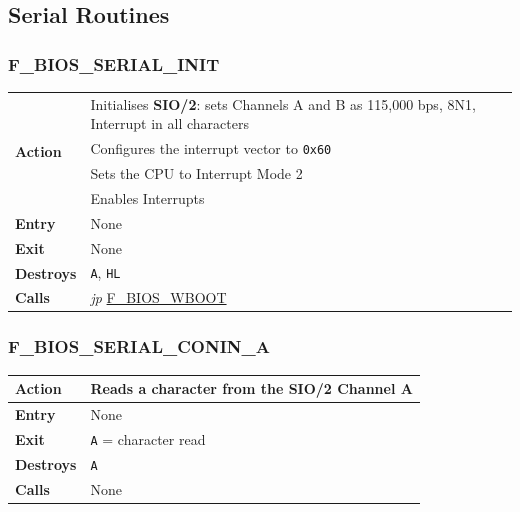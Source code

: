 \documentclass[a4paper,11pt]{article}
\begin{document}
    \subsection{Serial Routines}

        \subsubsection{F\_BIOS\_SERIAL\_INIT}
        \label{func:fbiosserialinit}
        \begin{tabular}{l p{9cm}}
            \hline\multirow[t]{4}{4em}{\textbf{Action}}
            & Initialises \textbf{SIO/2}: sets Channels A and B as 115,000 bps, 
            8N1, Interrupt in all characters \\
            & Configures the interrupt vector to \texttt{0x60} \\
            & Sets the CPU to Interrupt Mode 2 \\
            & Enables Interrupts \\
            \hline\textbf{Entry} & None \\
            \hline\textbf{Exit} & None \\
            \hline\textbf{Destroys} & \texttt{A}, \texttt{HL} \\
            \hline\textbf{Calls} 
            & \textit{jp} \hyperref[func:fbioswboot]{F\_BIOS\_WBOOT} \\
            \hline
        \end{tabular}
        
        \subsubsection{F\_BIOS\_SERIAL\_CONIN\_A}
        \label{func:fbiosserialconina}
        \begin{tabular}{l p{9cm}}
            \hline\textbf{Action}
            & Reads a character from the \textbf{SIO/2} Channel A \\
            \hline\textbf{Entry} & None \\
            \hline\textbf{Exit} & \texttt{A} = character read \\
            \hline\textbf{Destroys} & \texttt{A} \\
            \hline\textbf{Calls} & None \\
            \hline
        \end{tabular}
\end{document}
